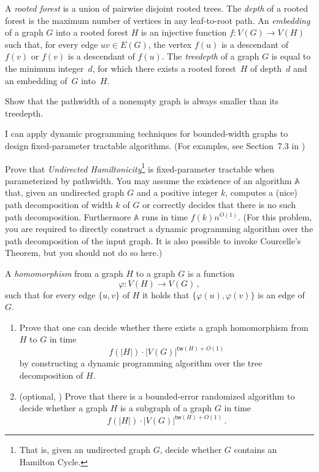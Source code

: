 \documentclass{uebung_cs}
\begin{document}
\begin{exercise}[Treedepth][\hard]
  A \emph{rooted forest} is a union of pairwise disjoint rooted trees. The \emph{depth} of a rooted forest is the maximum number of vertices in any leaf-to-root path. An \emph{embedding} of a graph $G$ into a rooted forest $H$ is an injective function $f \colon V (G) \rightarrow V(H)$ such that, for every edge $uv \in E(G)$, the vertex $f(u)$ is a descendant of $f(v)$ or $f(v)$ is a descendant of $f(u)$. The \emph{treedepth} of a graph $G$ is equal to the minimum integer~$d$, for which there exists a rooted forest~$H$ of depth~$d$ and an embedding of~$G$ into~$H$.

  Show that the pathwidth of a nonempty graph is always smaller than its treedepth.
\end{exercise}

\newpage
\begin{skill}
  I can apply dynamic programming techniques for bounded-width graphs to design fixed-parameter tractable algorithms. \normalfont (For examples, see Section~7.3 in \cygan{})
\end{skill}

\begin{exercise}
  Prove that \emph{Undirected Hamiltonicity}\footnote{That is, given an undirected graph $G$, decide whether $G$ contains an Hamilton Cycle.} is fixed-parameter tractable when parameterized by pathwidth. You may assume the existence of an algorithm $\mathbb{A}$ that, given an undirected graph $G$ and a positive integer $k$, computes a (nice) path decomposition of width $k$ of $G$ or correctly decides that there is no such path decomposition. Furthermore $\mathbb{A}$ runs in time $f(k) n^{O(1)}$. (For this problem, you are required to directly construct a dynamic programming algorithm over the path decomposition of the input graph. It is also possible to invoke Courcelle's Theorem, but you should not do so here.)
\end{exercise}

\begin{exercise}
  A \emph{homomorphism} from a graph $H$ to a graph $G$ is a function \[\varphi:V(H)\rightarrow V(G) \,, \] such that for every edge $\{u,v\}$ of $H$ it holds that $\{\varphi(u),\varphi(v)\}$ is an edge of $G$.
  \begin{enumerate}
    \item Prove that one can decide whether there exists a graph homomorphism from $H$ to $G$ in time
          \[f(|H|)\cdot |V(G)|^{\mathsf{tw}(H)+O(1)} \]
          by constructing a dynamic programming algorithm over the tree decomposition of $H$.
    \item (optional, \hard) Prove that there is a bounded-error randomized algorithm to decide whether a graph $H$ is a subgraph of a graph $G$ in time
          \[f(|H|)\cdot |V(G)|^{\mathsf{tw}(H)+O(1)} \,.\]
  \end{enumerate}
\end{exercise}
\end{document}
